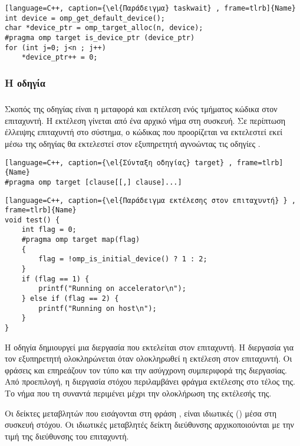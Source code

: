 \begin{lstlisting}[language=C++, caption={\el{Παράδειγμα} taskwait} , frame=tlrb]{Name}
int device = omp_get_default_device();
char *device_ptr = omp_target_alloc(n, device);
#pragma omp target is_device_ptr (device_ptr)
for (int j=0; j<n ; j++)
	*device_ptr++ = 0;
\end{lstlisting}
\clearpage


\subsubsection{Η οδηγία }
\subparagraph{}
Σκοπός της οδηγίας \emph{} είναι η μεταφορά και εκτέλεση ενός τμήματος κώδικα στον επιταχυντή. Η εκτέλεση γίνεται από ένα αρχικό νήμα στη συσκευή. Σε περίπτωση έλλειψης επιταχυντή στο σύστημα, ο κώδικας που προορίζεται να εκτελεστεί εκεί μέσω της οδηγίας \emph{} θα εκτελεστεί στον εξυπηρετητή αγνοώντας τις οδηγίες \emph{}.

\begin{lstlisting}[language=C++, caption={\el{Σύνταξη οδηγίας} target} , frame=tlrb]{Name}
#pragma omp target [clause[[,] clause]...]
\end{lstlisting}

\begin{lstlisting}[language=C++, caption={\el{Παράδειγμα εκτέλεσης στον επιταχυντή} } , frame=tlrb]{Name}
void test() {
	int flag = 0;
	#pragma omp target map(flag)
	{
		flag = !omp_is_initial_device() ? 1 : 2;
	}
	if (flag == 1) {
		printf("Running on accelerator\n");
	} else if (flag == 2) {
		printf("Running on host\n");
	}
}
\end{lstlisting}
Η οδηγία \emph{} δημιουργεί μια διεργασία που εκτελείται στον επιταχυντή. Η διεργασία για τον εξυπηρετητή
ολοκληρώνεται όταν ολοκληρωθεί η εκτέλεση στον επιταχυντή. Οι φράσεις \emph{} και \emph{}
επηρεάζουν τον τύπο και την ασύγχρονη συμπεριφορά της διεργασίας. Από προεπιλογή, η διεργασία στόχου περιλαμβάνει φράγμα
εκτέλεσης στο τέλος της. Το νήμα που τη συναντά περιμένει μέχρι την ολοκλήρωση της εκτέλεσής της.

Οι δείκτες μεταβλητών που εισάγονται στη φράση \emph{}, είναι ιδιωτικές (\emph{}) μέσα στη συσκευή
στόχου. Οι ιδιωτικές μεταβλητές δείκτη διεύθυνσης αρχικοποιούνται με την τιμή της διεύθυνσης του επιταχυντή.

